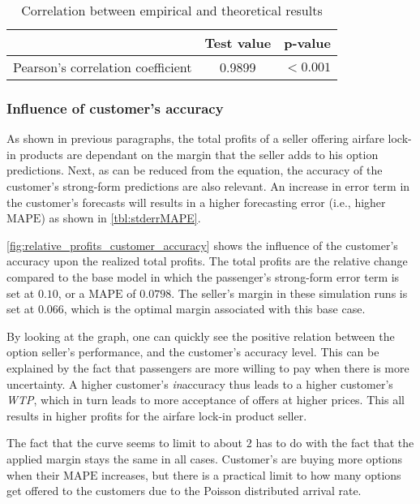 \begin{table}
\centering
\begin{tabular}{l c c}
\toprule
~  &  Test value  &  p-value  \\
\midrule
Pearson's correlation coefficient   &  0.9899  &  $< 0.001$ \\
\bottomrule
\end{tabular}
\caption{Correlation between empirical and theoretical results}
\label{tbl:pearson_theory_empirical}
\end{table}



\subsubsection{Influence of customer's accuracy}
As shown in previous paragraphs, the total profits of a seller offering airfare lock-in products are dependant on the margin that the seller adds to his option predictions. Next, as can be reduced from the equation, the accuracy of the customer's strong-form predictions are also relevant. An increase in error term in the customer's forecasts will results in a higher forecasting error (i.e., higher $\mbox{MAPE}$) as shown in \autoref{tbl:stderrMAPE}.

\autoref{fig:relative_profits_customer_accuracy} shows the influence of the customer's accuracy upon the realized total profits. The total profits are the relative change compared to the base model in which the passenger's strong-form error term is set at $0.10$, or a $\mbox{MAPE}$ of $0.0798$. The seller's margin in these simulation runs is set at $0.066$, which is the optimal margin associated with this base case.


By looking at the graph, one can quickly see the positive relation between the option seller's performance, and the customer's accuracy level. This can be explained by the fact that passengers are more willing to pay when there is more uncertainty. A higher customer's \emph{in}accuracy thus leads to a higher customer's \emph{WTP}, which in turn leads to more acceptance of offers at higher prices. This all results in higher profits for the airfare lock-in product seller.

The fact that the curve seems to limit to about $2$ has to do with the fact that the applied margin stays the same in all cases. Customer's are buying more options when their $\mbox{MAPE}$ increases, but there is a practical limit to how many options get offered to the customers due to the Poisson distributed arrival rate.

